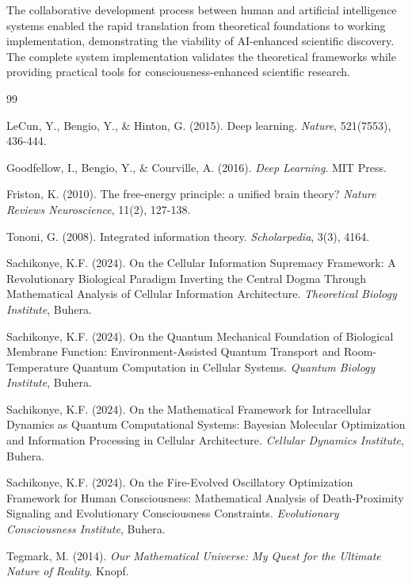 \documentclass[12pt,a4paper]{article}
\theoremstyle{remark}
\begin{document}
The collaborative development process between human and artificial intelligence systems enabled the rapid translation from theoretical foundations to working implementation, demonstrating the viability of AI-enhanced scientific discovery. The complete system implementation validates the theoretical frameworks while providing practical tools for consciousness-enhanced scientific research.


\begin{thebibliography}{99}

LeCun, Y., Bengio, Y., \& Hinton, G. (2015). Deep learning. \textit{Nature}, 521(7553), 436-444.

Goodfellow, I., Bengio, Y., \& Courville, A. (2016). \textit{Deep Learning}. MIT Press.

Friston, K. (2010). The free-energy principle: a unified brain theory? \textit{Nature Reviews Neuroscience}, 11(2), 127-138.

Tononi, G. (2008). Integrated information theory. \textit{Scholarpedia}, 3(3), 4164.

Sachikonye, K.F. (2024). On the Cellular Information Supremacy Framework: A Revolutionary Biological Paradigm Inverting the Central Dogma Through Mathematical Analysis of Cellular Information Architecture. \textit{Theoretical Biology Institute}, Buhera.

Sachikonye, K.F. (2024). On the Quantum Mechanical Foundation of Biological Membrane Function: Environment-Assisted Quantum Transport and Room-Temperature Quantum Computation in Cellular Systems. \textit{Quantum Biology Institute}, Buhera.

Sachikonye, K.F. (2024). On the Mathematical Framework for Intracellular Dynamics as Quantum Computational Systems: Bayesian Molecular Optimization and Information Processing in Cellular Architecture. \textit{Cellular Dynamics Institute}, Buhera.

Sachikonye, K.F. (2024). On the Fire-Evolved Oscillatory Optimization Framework for Human Consciousness: Mathematical Analysis of Death-Proximity Signaling and Evolutionary Consciousness Constraints. \textit{Evolutionary Consciousness Institute}, Buhera.

Tegmark, M. (2014). \textit{Our Mathematical Universe: My Quest for the Ultimate Nature of Reality}. Knopf.


\end{thebibliography}
\end{document}

